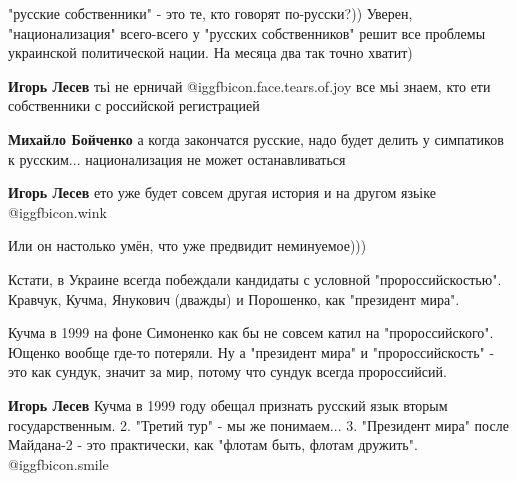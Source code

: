 \begin{itemize}
\begin{itemize} %
"русские собственники" - это те, кто говорят по-русски?)) Уверен, "национализация" всего-всего у "русских собственников" решит все проблемы украинской политической нации. На месяца два так точно хватит)

\textbf{Игорь Лесев} тьі не ерничай @igg{fbicon.face.tears.of.joy}  все мьі знаем, кто ети собственники с российской регистрацией

\textbf{Михайло Бойченко} а когда закончатся русские, надо будет делить у симпатиков к русским... национализация не может останавливаться

\textbf{Игорь Лесев} ето уже будет совсем другая история и на другом язьіке @igg{fbicon.wink} 
\end{itemize} %

Или он настолько умён, что уже предвидит неминуемое)))


Кстати, в Украине всегда побеждали кандидаты с условной "пророссийскостью".
Кравчук, Кучма, Янукович (дважды) и Порошенко, как "президент мира".

\begin{itemize} %

Кучма в 1999 на фоне Симоненко как бы не совсем катил на "пророссийского".
Ющенко вообще где-то потеряли. Ну а "президент мира" и "пророссийскость" - это
как сундук, значит за мир, потому что сундук всегда пророссийсий.

\textbf{Игорь Лесев} Кучма в 1999 году обещал признать русский язык вторым государственным. 2. "Третий тур" - мы же понимаем... 3. "Президент мира" после Майдана-2 - это практически, как "флотам быть, флотам дружить".  @igg{fbicon.smile} 
\end{itemize} %

\end{itemize} %
